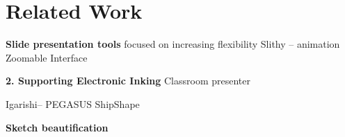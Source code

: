 \section{Related Work}

\textbf{Slide presentation tools}
focused on increasing flexibility
Slithy -- animation
Zoomable Interface

\textbf{2. Supporting Electronic Inking}
\textbf{}
Classroom presenter

Igarishi-- PEGASUS
ShipShape

\textbf{Sketch beautification}

